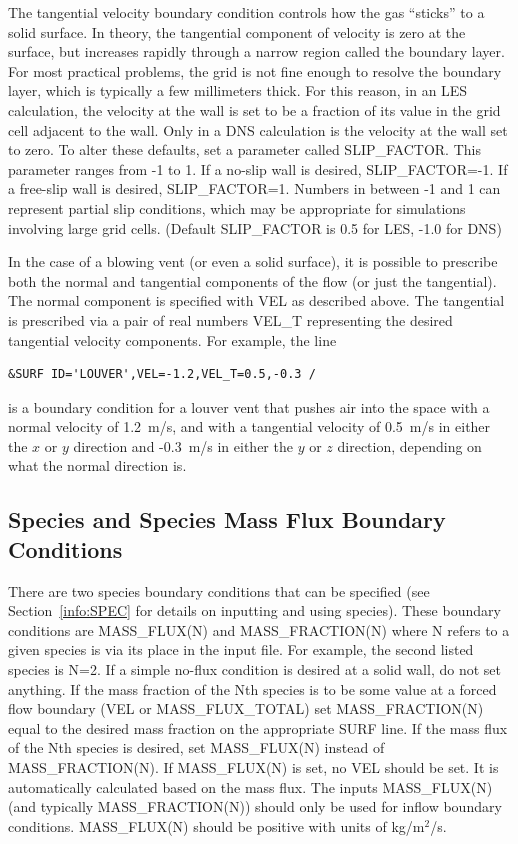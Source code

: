 \documentclass[11pt]{book}
\begin{document}
The tangential velocity boundary condition controls how the gas
``sticks'' to a solid surface. In theory, the tangential component of
velocity is zero at the surface, but
increases rapidly through a narrow region called the boundary layer.
For most practical problems, the grid is not fine enough to resolve the
boundary layer, which is typically a few millimeters thick.
For this reason, in an LES calculation, the velocity at the wall
is set to be a fraction of its value in the grid cell adjacent to the
wall. Only in a DNS calculation is the velocity at the wall set to zero.
To alter these defaults, set a parameter called
{\ct SLIP\_FACTOR}. This parameter ranges from -1 to 1. If a no-slip wall is
desired, {\ct SLIP\_FACTOR=-1}. If a free-slip wall is desired, {\ct SLIP\_FACTOR=1}.
Numbers in between -1 and 1 can represent partial slip conditions,
which may be appropriate for simulations involving large grid cells.
(Default {\ct SLIP\_FACTOR} is 0.5 for LES, -1.0 for DNS)

In the case of a blowing vent (or even a solid surface),
it is possible to prescribe both the
normal and tangential components of the flow (or just the tangential).
The normal component is
specified with {\ct VEL} as described above. The tangential is prescribed
via a pair of real numbers {\ct VEL\_T} representing the desired tangential
velocity components. For example, the line

\footnotesize
\begin{verbatim}
&SURF ID='LOUVER',VEL=-1.2,VEL_T=0.5,-0.3 /
\end{verbatim}
\normalsize

\noindent
is a boundary condition for a louver vent that pushes air into the
space with a normal velocity of 1.2~m/s, and with a tangential velocity
of 0.5~m/s in either the $x$ or $y$ direction and -0.3~m/s in either
the $y$ or $z$ direction, depending on what the normal direction is.

\subsection{Species and Species Mass Flux Boundary Conditions}

There are two species boundary conditions that can be specified
(see Section~\ref{info:SPEC} for details on inputting and using species).
These boundary conditions are {\ct MASS\_FLUX(N)} and {\ct MASS\_FRACTION(N)}
where {\ct N} refers to a given species is via its place in the
input file. For example, the second listed species is {\ct N=2}.
If a simple no-flux condition is desired at a solid wall, do not set
anything. If the mass fraction of the {\ct N}th species is to be some
value at a forced flow boundary ({\ct VEL} or {\ct MASS\_FLUX\_TOTAL}) set
{\ct MASS\_FRACTION(N)} equal to the desired mass fraction on the appropriate
{\ct SURF} line.
If the mass flux of the {\ct N}th species is desired, set
{\ct MASS\_FLUX(N)} instead of {\ct MASS\_FRACTION(N)}.
If {\ct MASS\_FLUX(N)}
is set, no {\ct VEL} should be set. It is automatically
calculated based on the mass flux.
The inputs {\ct MASS\_FLUX(N)} (and typically {\ct MASS\_FRACTION(N)}) should only be used
for inflow boundary conditions.  {\ct MASS\_FLUX(N)} should be positive with
units of kg/m$^2$/s.
\end{document}
